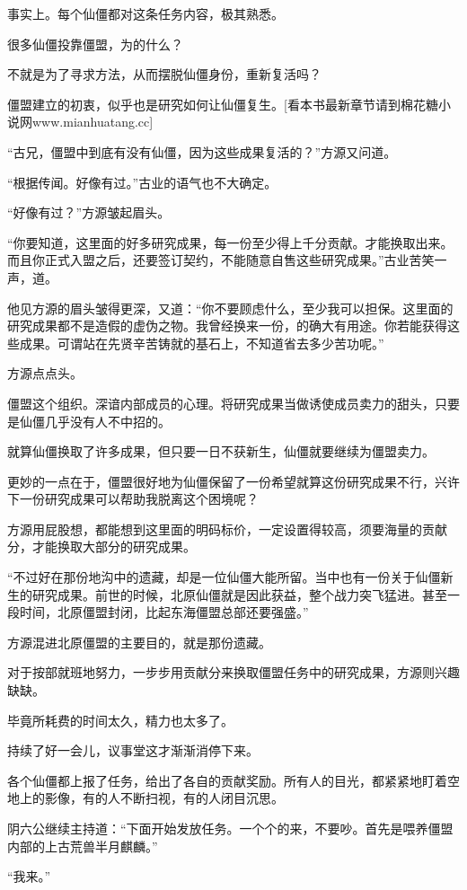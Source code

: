 \begin{this_body}
事实上。每个仙僵都对这条任务内容，极其熟悉。

很多仙僵投靠僵盟，为的什么？

不就是为了寻求方法，从而摆脱仙僵身份，重新复活吗？

僵盟建立的初衷，似乎也是研究如何让仙僵复生。[看本书最新章节请到棉花糖小说网www.mianhuatang.cc]

“古兄，僵盟中到底有没有仙僵，因为这些成果复活的？”方源又问道。

“根据传闻。好像有过。”古业的语气也不大确定。

“好像有过？”方源皱起眉头。

“你要知道，这里面的好多研究成果，每一份至少得上千分贡献。才能换取出来。而且你正式入盟之后，还要签订契约，不能随意自售这些研究成果。”古业苦笑一声，道。

他见方源的眉头皱得更深，又道：“你不要顾虑什么，至少我可以担保。这里面的研究成果都不是造假的虚伪之物。我曾经换来一份，的确大有用途。你若能获得这些成果。可谓站在先贤辛苦铸就的基石上，不知道省去多少苦功呢。”

方源点点头。

僵盟这个组织。深谙内部成员的心理。将研究成果当做诱使成员卖力的甜头，只要是仙僵几乎没有人不中招的。

就算仙僵换取了许多成果，但只要一日不获新生，仙僵就要继续为僵盟卖力。

更妙的一点在于，僵盟很好地为仙僵保留了一份希望就算这份研究成果不行，兴许下一份研究成果可以帮助我脱离这个困境呢？

方源用屁股想，都能想到这里面的明码标价，一定设置得较高，须要海量的贡献分，才能换取大部分的研究成果。

“不过好在那份地沟中的遗藏，却是一位仙僵大能所留。当中也有一份关于仙僵新生的研究成果。前世的时候，北原仙僵就是因此获益，整个战力突飞猛进。甚至一段时间，北原僵盟封闭，比起东海僵盟总部还要强盛。”

方源混进北原僵盟的主要目的，就是那份遗藏。

对于按部就班地努力，一步步用贡献分来换取僵盟任务中的研究成果，方源则兴趣缺缺。

毕竟所耗费的时间太久，精力也太多了。

持续了好一会儿，议事堂这才渐渐消停下来。

各个仙僵都上报了任务，给出了各自的贡献奖励。所有人的目光，都紧紧地盯着空地上的影像，有的人不断扫视，有的人闭目沉思。

阴六公继续主持道：“下面开始发放任务。一个个的来，不要吵。首先是喂养僵盟内部的上古荒兽半月麒麟。”

“我来。”


\end{this_body}
